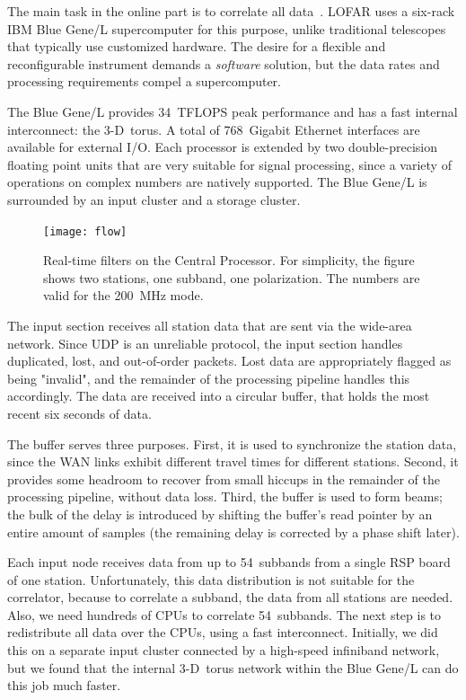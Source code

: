 \documentclass[journal]{IEEEtran}
\begin{document}
The main task in the online part is to correlate all data~\cite{Romein:06}.
LOFAR uses a six-rack IBM Blue Gene/L supercomputer for this purpose,
unlike traditional telescopes that typically use customized hardware.
The desire for a flexible and reconfigurable instrument demands a
{\em software\/} solution, but the data rates and processing requirements
compel a supercomputer.

The Blue Gene/L provides 34~TFLOPS peak performance and has a fast internal
interconnect: the 3-D~torus.
A total of 768~Gigabit Ethernet interfaces are available for external I/O.
Each processor is extended by two double-precision floating point units
that are very suitable for signal processing, since a variety of operations
on complex numbers are natively supported.
The Blue Gene/L is surrounded by an input cluster and a storage cluster.


\begin{figure}
\texttt{[image: flow]}
\caption{Real-time filters on the Central Processor.  For simplicity, the
figure shows two stations, one subband, one polarization.  The numbers are
valid for the 200~MHz mode.}
\label{fig:flow}
\end{figure}

The input section receives all station data that are sent via the wide-area
network.
Since UDP is an unreliable protocol, the input section handles duplicated,
lost, and out-of-order packets.
Lost data are appropriately flagged as being "invalid", and the remainder
of the processing pipeline handles this accordingly.
The data are received into a circular buffer, that holds the most recent
six seconds of data.

The buffer serves three purposes.
First, it is used to synchronize the station data, since the WAN links
exhibit different travel times for different stations.
Second, it provides some headroom to recover from small hiccups in the
remainder of the processing pipeline, without data loss.
Third, the buffer is used to form beams; the bulk of the delay is introduced
by shifting the buffer's read pointer by an entire amount of samples
(the remaining delay is corrected by a phase shift later).

Each input node receives data from up to 54~subbands from a single RSP board
of one station.
Unfortunately, this data distribution is not suitable for the correlator,
because to correlate a subband, the data from all stations are needed.
Also, we need hundreds of CPUs to correlate 54~subbands.
The next step is to redistribute all data over the CPUs, using a fast
interconnect.
Initially, we did this on a separate input cluster connected by a high-speed
infiniband network, but we found that the internal 3-D~torus network within
the Blue Gene/L can do this job much faster.
\end{document}
